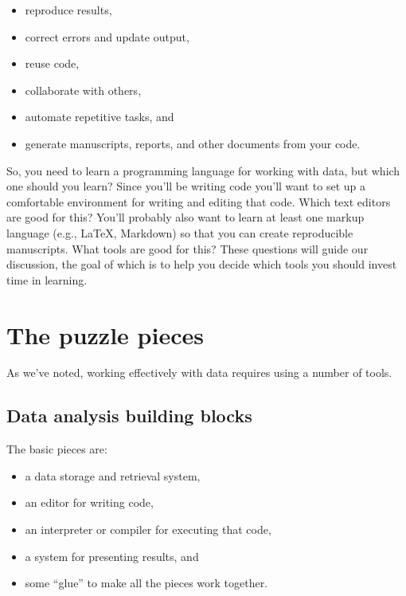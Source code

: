 \documentclass[]{book}
\providecommand{\tightlist}{%
  \setlength{\itemsep}{0pt}\setlength{\parskip}{0pt}}
\begin{document}
\begin{itemize}
\tightlist
\item
  reproduce results,
\item
  correct errors and update output,
\item
  reuse code,
\item
  collaborate with others,
\item
  automate repetitive tasks, and
\item
  generate manuscripts, reports, and other documents from your code.
\end{itemize}

So, you need to learn a programming language for working with data, but which one should you learn? Since you'll be writing code you'll want to set up a comfortable environment for writing and editing that code. Which text editors are good for this? You'll probably also want to learn at least one markup language (e.g., LaTeX, Markdown) so that you can create reproducible manuscripts. What tools are good for this? These questions will guide our discussion, the goal of which is to help you decide which tools you should invest time in learning.

\hypertarget{the-puzzle-pieces}{%
\section{The puzzle pieces}\label{the-puzzle-pieces}}

As we've noted, working effectively with data requires using a number of tools.

\hypertarget{data-analysis-building-blocks}{%
\subsection{Data analysis building blocks}\label{data-analysis-building-blocks}}

The basic pieces are:

\begin{itemize}
\tightlist
\item
  a data storage and retrieval system,
\item
  an editor for writing code,
\item
  an interpreter or compiler for executing that code,
\item
  a system for presenting results, and
\item
  some ``glue'' to make all the pieces work together.
\end{itemize}
\end{document}
